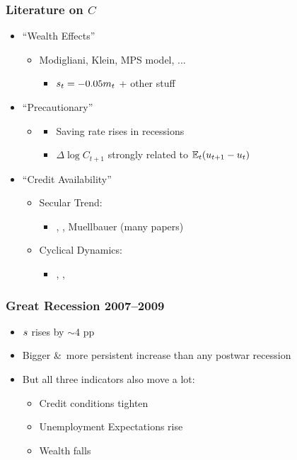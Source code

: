 \documentclass[pdflatex]{beamer}
\newcommand{\jemph}[1]{{\color{jirkasred}#1}}
\begin{document}
\begin{frame}\frametitle{\bf Literature on $C$ }

  \begin{itemize}
  \item \jemph{``Wealth Effects''}
    \begin{itemize}
    \item Modigliani, Klein, MPS model, ...
      \begin{itemize} \item $s_{t} = -0.05 m_{t}$ + other stuff
      \end{itemize}
    \end{itemize}
  \item \jemph{``Precautionary''}
    \begin{itemize}
    \item \cite{carroll:brookings}
      \begin{itemize}
      \item Saving rate rises in recessions
      \item $\Delta \log C_{t+1}$ strongly related to $\mathbb{E}_{t}(u_{t+1}-u_{t})$
      \end{itemize}
    \end{itemize}
  \item \jemph{``Credit Availability''}
    \begin{itemize}
    \item Secular Trend: \begin{itemize} \item \cite{parker_nberma_spendthrift}, \cite{dynanKohnDebt}, Muellbauer (many papers) \end{itemize}
    \item Cyclical Dynamics: \begin{itemize}
      \item \cite{glLiq}, \cite{gkLiq}, \cite{hall:slump} \end{itemize}
    \end{itemize}
  \end{itemize}


\end{frame}


\begin{frame}\frametitle{\textbf{Great Recession 2007--2009}}


  \begin{itemize}
  \item $s$ rises by $\sim$4 pp
  \item \jemph{Bigger \&\ more persistent increase} than any postwar recession
  \item But all three indicators also move a lot:
    \begin{itemize}
    \item Credit conditions tighten
    \item Unemployment Expectations rise
    \item Wealth falls
    \end{itemize}
  \end{itemize}

\end{frame}
\end{document}
